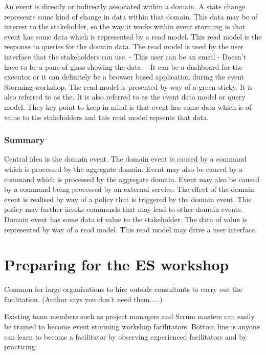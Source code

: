 \documentclass[a4paper, 11pt]{book}
\begin{document}
    An event is directly or indirectly associated within a domain.
    A state change represents some kind of change in data within that domain.
    This data may be of interest to the stakeholder, so the way it works within event storming is that event has some data which is represented by a read model.
    This read model is the response to queries for the domain data.
    The read model is used by the user interface that the stakeholders can use.
    - This user can be an email
    - Doesn't have to be a pane of glass showing the data.
    - It can be a dashboard for the executor or it can definitely be a browser based application during the event Storming workshop.
    The read model is presented by way of a green sticky.
    It is also referred to as the.
    It is also referred to as the event data model or query model.
    They key point to keep in mind is that event has some data which is of value to the stakeholders and this read model repsents that data.

    \subsubsection{Summary}
    Central idea is the domain event.
    The domain event is caused by a command which is processed by the aggregate domain.
    Event may also be caused by a command which is processed by the aggregate domain.
    Event may also be caused by a command being processed by an external service.
    The effect of the domain event is realised by way of a policy that is triggered by the domain event.
    This policy may further invoke commands that may lead to other domain events.
    Domain event has some data of value to the stakeholder.
    The data of value is represented by way of a read model.
    This read model may drive a user interface.


    \section{Preparing for the ES workshop}

    Common for large organisations to hire outside consultants to carry out the facilitation.
    (Author says you don't need them.....)

    Existing team members such as project managers and Scrum masters can easily be trained to become event storming workshop facilitators.
    Bottom line is anyone can learn to become a facilitator by observing experienced facilitators and by practicing.
\end{document}
